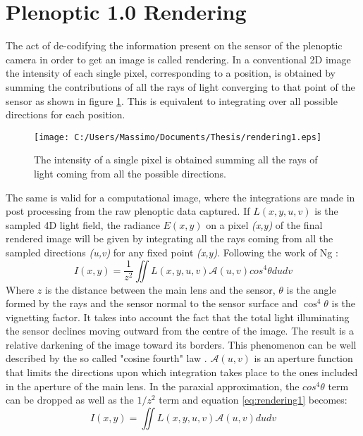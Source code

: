 \section{Plenoptic 1.0 Rendering}
\label{sec:rendering1}
The act of de-codifying the information present on the sensor of the plenoptic camera in order to get an image is called rendering. 
In a conventional 2D image the intensity of each single pixel, corresponding to a position, is obtained by summing the contributions of all the rays of light converging to that point of the sensor \cite{georgiev2010focused} as shown in figure \ref{fig:render1}. This is equivalent to integrating over all possible directions for each position. 
\begin{figure}[H]
	\centering
	\texttt{[image: C:/Users/Massimo/Documents/Thesis/rendering1.eps]}
	\caption{\label{fig:render1} The intensity of a single pixel is obtained summing all the rays of light coming from all the possible directions.\cite{ng2006digital} }
\end{figure}
The same is valid for a computational image, where the integrations are made in post processing from the raw plenoptic data captured.
 If $L(x,y,u,v)$ is the sampled 4D light field, the radiance $E(x,y)$ on a pixel \textit{(x,y)} of the final rendered image will be given by integrating all the rays coming from all the sampled directions \textit{(u,v)} for any fixed point\textit{ (x,y)}. Following the work of Ng \cite{ng2006digital}:
\begin{equation}
\label{eq:rendering1}
I(x,y)=\dfrac{1}{z^2}\iint L(x,y,u,v)\mathscr{A}(u,v)cos^4\theta dudv
\end{equation} 
Where $z$ is the distance between the main lens and the sensor, $\theta$ is the angle formed by the rays and the sensor normal to the sensor surface and $\cos^4\theta$ is the vignetting factor. It takes into account the fact that the total light illuminating the sensor  declines moving outward  from  the  centre  of  the  image. The result is a relative darkening of the image toward 
its borders. This phenomenon can be well described by the so called "cosine fourth" law \cite{kerr2007derivation}. $\mathscr{A}(u,v)$ is an aperture function that limits the directions upon which integration takes place to the ones included in the aperture of the main lens. In the paraxial approximation, the $cos^4\theta$ term can be dropped as well as the $1/z^2$ term and equation \ref{eq:rendering1} becomes:
\begin{equation}
\label{eq:rendering2}
I(x,y)=\iint L(x,y,u,v)\mathscr{A}(u,v) dudv
\end{equation}
